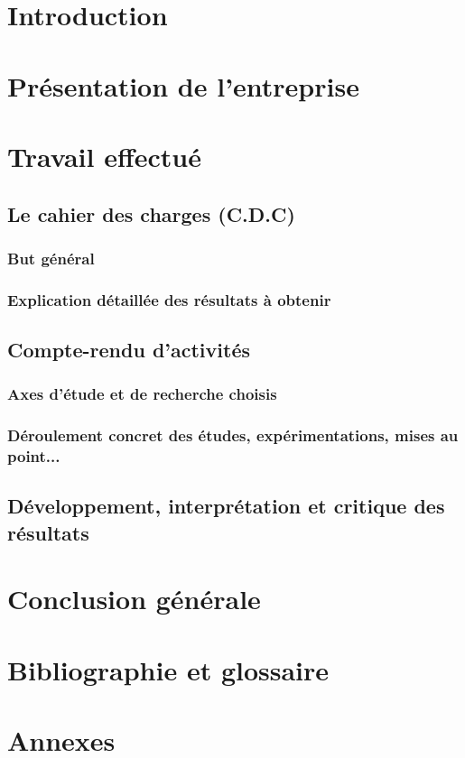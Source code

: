 \documentclass[12pt,a4paper]{report}
\begin{document}
\chapter{Introduction}


\chapter{Présentation de l'entreprise}


\chapter{Travail effectué}
\section{Le cahier des charges (C.D.C)}
\subsection{But général}
\subsection{Explication détaillée des résultats à obtenir}

\section{Compte-rendu d'activités}
\subsection{Axes d'étude et de recherche choisis}
\subsection{Déroulement concret des études, expérimentations, mises au point...}

\section{Développement, interprétation et critique des résultats}

\chapter{Conclusion générale}

\chapter{Bibliographie et glossaire}
\begin{thebibliography}{99}
\end{thebibliography}

\chapter{Annexes}
\end{document}
